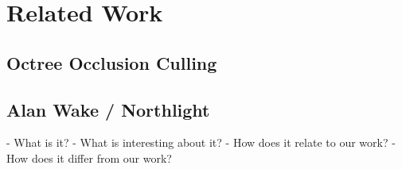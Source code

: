 \chapter{Related Work} \label{cpt-related-work}

\section{Octree Occlusion Culling}



\section{Alan Wake / Northlight}

- What is it?
- What is interesting about it?
- How does it relate to our work?
- How does it differ from our work?
